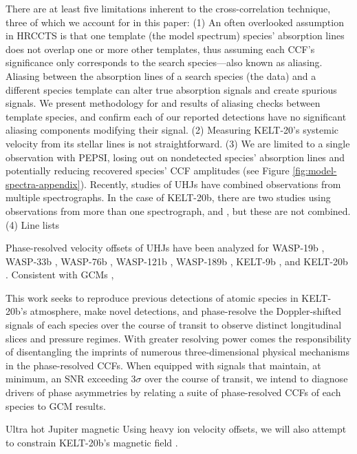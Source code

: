 \documentclass[twocolumn]{aastex631}
\begin{document}
        There are at least five limitations inherent to the cross-correlation technique, three of which we account for in this paper: (1) An often overlooked assumption in HRCCTS is that one template (the model spectrum) species' absorption lines does not overlap one or more other templates, thus assuming each CCF's significance only corresponds to the search species---also known as aliasing. Aliasing between the absorption lines of a search species (the data) and a different species template can alter true absorption signals and create spurious signals. We present methodology for and results of aliasing checks between template species, and confirm each of our reported detections have no significant aliasing components modifying their signal. (2) Measuring KELT-20's systemic velocity from its stellar lines is not straightforward. \citep{Pino2022} (3) We are limited to a single observation with PEPSI, losing out on nondetected species' absorption lines and potentially reducing recovered species' CCF amplitudes (see Figure \ref{fig:model-spectra-appendix}). Recently, studies of UHJs have combined observations from multiple spectrographs. In the case of KELT-20b, there are two studies using observations from more than one spectrograph, \citet{CasasayasBarris2019} and \citet{Nugroho2020}, but these are not combined. (4) Line lists


        Phase-resolved velocity offsets of UHJs have been analyzed for WASP-19b \citep{}, WASP-33b \citep{Cauley2021}, WASP-76b \citep{Ehrenreich2020, Kesseli2022}, WASP-121b \citep{Wardenier2024}, WASP-189b \citep{Prinoth2023}, KELT-9b \citep{Cauley2019, Pino2022}, and KELT-20b \citep{Hoeijmakers2020, Rainer2021}. Consistent with GCMs \citep{},  


        This work seeks to reproduce previous detections of atomic species in KELT-20b's atmosphere, make novel detections, and phase-resolve the Doppler-shifted signals of each species over the course of transit to observe distinct longitudinal slices and pressure regimes. With greater resolving power comes the responsibility of disentangling the imprints of numerous three-dimensional physical mechanisms in the phase-resolved CCFs. When equipped with signals that maintain, at minimum, an SNR exceeding $3\sigma$ over the course of transit, we intend to diagnose drivers of phase asymmetries by relating a suite of phase-resolved CCFs of each species to GCM results.

        Ultra hot Jupiter magnetic 
        Using heavy ion velocity offsets, we will also attempt to constrain KELT-20b's magnetic field \citep{Savel2024}.
\end{document}
